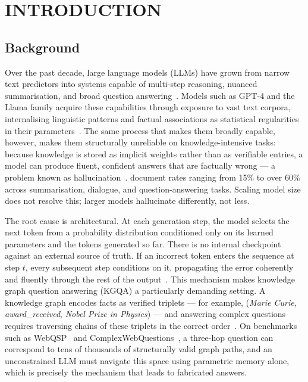 
\chapter{INTRODUCTION}

\ifpdf
  \graphicspath{{introduction/figures/PNG}{introduction/figures/PDF}{introduction/figures}}
\else
  \graphicspath{{introduction/figures/EPS}{introduction/figures}}
\fi

\section{Background}

Over the past decade, large language models (LLMs) have grown from narrow text predictors into systems capable of multi-step reasoning, nuanced summarisation, and broad question answering~\citep{brown2020gpt3,openai2024gpt4technicalreport}. Models such as GPT-4 and the Llama family acquire these capabilities through exposure to vast text corpora, internalising linguistic patterns and factual associations as statistical regularities in their parameters~\citep{touvron2023llama,dubey2024llama3}. The same process that makes them broadly capable, however, makes them structurally unreliable on knowledge-intensive tasks: because knowledge is stored as implicit weights rather than as verifiable entries, a model can produce fluent, confident answers that are factually wrong — a problem known as hallucination~\citep{ji2023survey}. \citet{ji2023survey} document rates ranging from 15\% to over 60\% across summarisation, dialogue, and question-answering tasks. Scaling model size does not resolve this; larger models hallucinate differently, not less.

The root cause is architectural. At each generation step, the model selects the next token from a probability distribution conditioned only on its learned parameters and the tokens generated so far. There is no internal checkpoint against an external source of truth. If an incorrect token enters the sequence at step $t$, every subsequent step conditions on it, propagating the error coherently and fluently through the rest of the output~\citep{huang2023survey,ji2023survey}. This mechanism makes knowledge graph question answering (KGQA) a particularly demanding setting. A knowledge graph encodes facts as verified triplets — for example, (\textit{Marie Curie}, \textit{award\_received}, \textit{Nobel Prize in Physics}) — and answering complex questions requires traversing chains of these triplets in the correct order~\citep{bollacker2008freebase,lan2022survey}. On benchmarks such as WebQSP~\citep{yih2016websqp} and ComplexWebQuestions~\citep{talmor2018cwq}, a three-hop question can correspond to tens of thousands of structurally valid graph paths, and an unconstrained LLM must navigate this space using parametric memory alone, which is precisely the mechanism that leads to fabricated answers.

